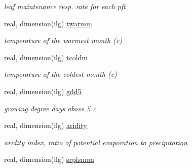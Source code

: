 \begin{DoxyCompactItemize}
\begin{DoxyCompactList}\small\item\em leaf maintenance resp. rate for each pft \end{DoxyCompactList}\item 
\hypertarget{structctem__statevars_1_1veg__gat_a6b97f459de178773e1d7d1278e6014a3}{}real, dimension(ilg) \hyperlink{structctem__statevars_1_1veg__gat_a6b97f459de178773e1d7d1278e6014a3}{twarmm}\label{structctem__statevars_1_1veg__gat_a6b97f459de178773e1d7d1278e6014a3}

\begin{DoxyCompactList}\small\item\em temperature of the warmest month (c) \end{DoxyCompactList}\item 
\hypertarget{structctem__statevars_1_1veg__gat_a6f107db053b78d41b8f24d14ef1be762}{}real, dimension(ilg) \hyperlink{structctem__statevars_1_1veg__gat_a6f107db053b78d41b8f24d14ef1be762}{tcoldm}\label{structctem__statevars_1_1veg__gat_a6f107db053b78d41b8f24d14ef1be762}

\begin{DoxyCompactList}\small\item\em temperature of the coldest month (c) \end{DoxyCompactList}\item 
\hypertarget{structctem__statevars_1_1veg__gat_a578da032a318a0184163c790e39928db}{}real, dimension(ilg) \hyperlink{structctem__statevars_1_1veg__gat_a578da032a318a0184163c790e39928db}{gdd5}\label{structctem__statevars_1_1veg__gat_a578da032a318a0184163c790e39928db}

\begin{DoxyCompactList}\small\item\em growing degree days above 5 c \end{DoxyCompactList}\item 
\hypertarget{structctem__statevars_1_1veg__gat_a3064e8f4582102977b4baea40e02b404}{}real, dimension(ilg) \hyperlink{structctem__statevars_1_1veg__gat_a3064e8f4582102977b4baea40e02b404}{aridity}\label{structctem__statevars_1_1veg__gat_a3064e8f4582102977b4baea40e02b404}

\begin{DoxyCompactList}\small\item\em aridity index, ratio of potential evaporation to precipitation \end{DoxyCompactList}\item 
\hypertarget{structctem__statevars_1_1veg__gat_a1240848293f77458712ea3692a27a6d9}{}real, dimension(ilg) \hyperlink{structctem__statevars_1_1veg__gat_a1240848293f77458712ea3692a27a6d9}{srplsmon}\label{structctem__statevars_1_1veg__gat_a1240848293f77458712ea3692a27a6d9}


\end{DoxyCompactItemize}

